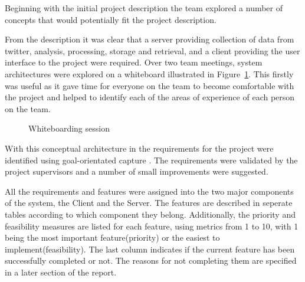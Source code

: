 Beginning with the initial project description the team explored a number of
concepts that would potentially fit the project description.

From the description it was clear that a server providing collection of data
from twitter, analysis, processing, storage and retrieval, and a client
providing the user interface to the project were required. Over two team
meetings, system architectures were explored on a whiteboard illustrated in
Figure~\ref{fig:whiteboarding_session}. This firstly was useful as it gave time for
everyone on the team to become comfortable with the project and helped to
identify each of the areas of experience of each person on the team.

\begin{figure}[htb]
\centering
\mbox{}

\caption{Whiteboarding session}
\label{fig:whiteboarding_session}
\end{figure}

With this conceptual architecture in the requirements for the project were
identified using goal-orientated capture \cite{dardenne93}. The requirements were validated by
the project supervisors and a number of small improvements were suggested.

All the requirements and features were assigned into the two major components of the system, 
the Client and the Server. The features are described in seperate tables according to which component they belong. 
Additionally, the priority and feasibility measures are listed for each feature, using metrics from 
1 to 10, with 1 being the most important feature(priority) or the easiest to implement(feasibility). 
The last column indicates if the current feature has been successfully completed or not. The reasons for 
not completing them are specified in a later section of the report.


